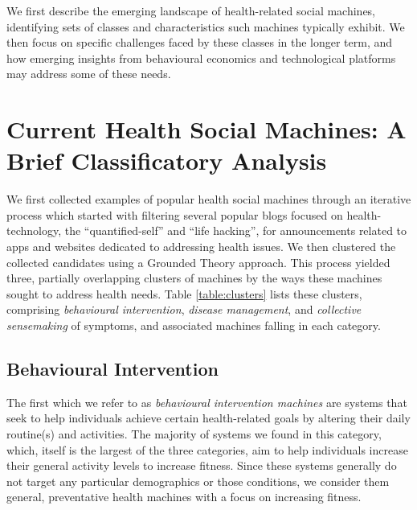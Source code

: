 \documentclass{sig-alternate}
\begin{document}
We first describe the emerging landscape of health-related social
machines, identifying sets of classes and characteristics such
machines typically exhibit.  We then focus on specific challenges
faced by these classes in the longer term, and how emerging insights
from behavioural economics and technological platforms may address
some of these needs.

\section{Current Health Social Machines: A Brief Classificatory Analysis}

We first collected examples of popular health social machines through
an iterative process which started with filtering several popular blogs
focused on health-technology, the ``quantified-self'' and ``life
hacking'', for announcements related to apps and websites dedicated to
addressing health issues. We then clustered the collected candidates
using a Grounded Theory approach.  This process yielded three,
partially overlapping clusters of machines by the ways these machines
sought to address health needs.  Table \ref{table:clusters} lists these
clusters, comprising \emph{behavioural intervention}, \emph{disease
  management}, and \emph{collective sensemaking} of symptoms, and
associated machines falling in each category.

\subsection{Behavioural Intervention}

The first which we refer to as \emph{behavioural intervention
  machines} are systems that seek to help individuals achieve certain
health-related goals by altering their daily routine(s) and
activities.  The majority of systems we found in this category, which,
itself is the largest of the three categories, aim to help individuals
increase their general activity levels to increase fitness.  Since
these systems generally do not target any particular demographics or
those conditions, we consider them general, preventative health
machines with a focus on increasing fitness.
\end{document}
